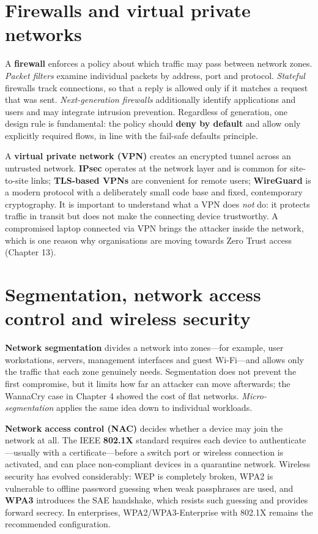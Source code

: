 \section{Firewalls and virtual private networks}\label{sec:6.5}
A \textbf{firewall} enforces a policy about which traffic may pass between network zones. \emph{Packet filters} examine individual packets by address, port and protocol. \emph{Stateful} firewalls track connections, so that a reply is allowed only if it matches a request that was sent. \emph{Next-generation firewalls} additionally identify applications and users and may integrate intrusion prevention. Regardless of generation, one design rule is fundamental: the policy should \textbf{deny by default} and allow only explicitly required flows, in line with the fail-safe defaults principle.

A \textbf{virtual private network (VPN)} creates an encrypted tunnel across an untrusted network. \textbf{IPsec} operates at the network layer and is common for site-to-site links; \textbf{TLS-based VPNs} are convenient for remote users; \textbf{WireGuard} is a modern protocol with a deliberately small code base and fixed, contemporary cryptography. It is important to understand what a VPN does \emph{not} do: it protects traffic in transit but does not make the connecting device trustworthy. A compromised laptop connected via VPN brings the attacker inside the network, which is one reason why organisations are moving towards Zero Trust access (Chapter 13).

\section{Segmentation, network access control and wireless security}\label{sec:6.6}
\textbf{Network segmentation} divides a network into zones—for example, user workstations, servers, management interfaces and guest Wi-Fi—and allows only the traffic that each zone genuinely needs. Segmentation does not prevent the first compromise, but it limits how far an attacker can move afterwards; the WannaCry case in Chapter 4 showed the cost of flat networks. \emph{Micro-segmentation} applies the same idea down to individual workloads.

\textbf{Network access control (NAC)} decides whether a device may join the network at all. The IEEE \textbf{802.1X} standard requires each device to authenticate—usually with a certificate—before a switch port or wireless connection is activated, and can place non-compliant devices in a quarantine network. Wireless security has evolved considerably: WEP is completely broken, WPA2 is vulnerable to offline password guessing when weak passphrases are used, and \textbf{WPA3} introduces the SAE handshake, which resists such guessing and provides forward secrecy. In enterprises, WPA2/WPA3-Enterprise with 802.1X remains the recommended configuration.

